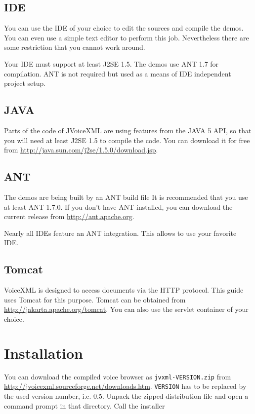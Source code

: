 \documentclass[11pt,a4paper]{article}
\begin{document}
\subsection{IDE}
\label{sec:ide}

You can use the IDE of your choice to edit the sources and compile the 
demos. You can even use a simple text editor to perform this job.
Nevertheless there are some restriction that you cannot work around.

Your IDE must support at least J2SE 1.5. The demos use ANT 1.7 for compilation. 
ANT is not required but used as a means of IDE independent project setup.

\subsection{JAVA}
\label{sec:java}

Parts of the code of JVoiceXML are using features from the JAVA 5 API, so that
you will need at least J2SE 1.5 to compile the code. You can download it
for free from \url{http://java.sun.com/j2se/1.5.0/download.jsp}.

\subsection{ANT}
\label{sec:ant}

The demos are being built by an ANT build file It is recommended that
you use at least ANT 1.7.0. 
If you don't have ANT installed, you can download the current release
from \url{http://ant.apache.org}.

Nearly all IDEs feature an ANT integration. This allows to use
your favorite IDE.

\subsection{Tomcat}
\label{sec:tomcat}

VoiceXML is designed to access documents via the HTTP protocol.
This guide uses Tomcat for this purpose. Tomcat can be obtained
from \url{http://jakarta.apache.org/tomcat}. You can also use
the servlet container of your choice.

\section{Installation}

You can download the compiled voice browser as \texttt{jvxml-VERSION.zip} from 
\url{http://jvoicexml.sourceforge.net/downloads.htm}.
\texttt{VERSION} has to be replaced by the used version number, i.e. 0.5.
Unpack the zipped distribution file and open a command prompt in that
directory. Call the installer 
\end{document}
